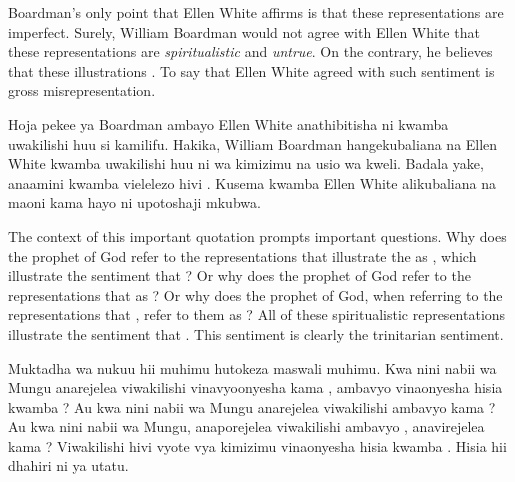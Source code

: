Boardman’s only point that Ellen White affirms is that these representations are imperfect. Surely, William Boardman would not agree with Ellen White that these representations are \textit{spiritualistic} and \textit{untrue}. On the contrary, he believes that these illustrations . To say that Ellen White agreed with such sentiment is gross misrepresentation.


Hoja pekee ya Boardman ambayo Ellen White anathibitisha ni kwamba uwakilishi huu si kamilifu. Hakika, William Boardman hangekubaliana na Ellen White kwamba uwakilishi huu ni wa kimizimu na usio wa kweli. Badala yake, anaamini kwamba vielelezo hivi . Kusema kwamba Ellen White alikubaliana na maoni kama hayo ni upotoshaji mkubwa.


The context of this important quotation prompts important questions. Why does the prophet of God refer to the representations that illustrate the  as , which illustrate the sentiment that ? Or why does the prophet of God refer to the representations that  as ? Or why does the prophet of God, when referring to the representations that , refer to them as ? All of these spiritualistic representations illustrate the sentiment that . This sentiment is clearly the trinitarian sentiment.


Muktadha wa nukuu hii muhimu hutokeza maswali muhimu. Kwa nini nabii wa Mungu anarejelea viwakilishi vinavyoonyesha  kama , ambavyo vinaonyesha hisia kwamba ? Au kwa nini nabii wa Mungu anarejelea viwakilishi ambavyo  kama ? Au kwa nini nabii wa Mungu, anaporejelea viwakilishi ambavyo , anavirejelea kama ? Viwakilishi hivi vyote vya kimizimu vinaonyesha hisia kwamba . Hisia hii dhahiri ni ya utatu.


